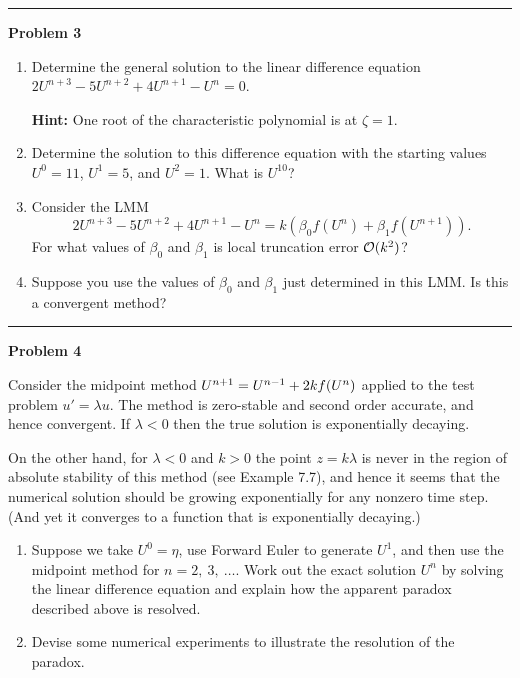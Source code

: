 \documentclass[10pt]{article}
\begin{document}


\vskip 1cm
\hrule
{\bf Problem 3}

\begin{enumerate}
\item Determine the general solution to the linear difference equation
$2U^{n+3} - 5U^{n+2} + 4U^{n+1} - U^n = 0$.

{\bf Hint:} One root of the characteristic polynomial is at $\zeta=1$.

\item Determine the solution to this difference equation with the starting
values $U^0=11$, $U^1=5$, and $U^2=1$.  What is $U^{10}$?

\item Consider the LMM
\[
2U^{n+3} - 5U^{n+2} + 4U^{n+1} - U^n = k(\beta_0 f(U^n) + \beta_1 f(U^{n+1})).
\]
For what values of $\beta_0$ and $\beta_1$ is local truncation error
${\mathcal O}(k^2)$?

\item Suppose you use the values of $\beta_0$ and $\beta_1$ just determined
in this LMM.  Is this a convergent method?

\end{enumerate} 




\vskip 1cm
\hrule
{\bf Problem 4}

Consider the midpoint method $U^{n+1} = U^{n-1} + 2kf(U^n)$ applied to the test
problem $u' = \lambda u$.  The method is zero-stable and second order
accurate, and hence convergent.  If $\lambda<0$ then the true solution
is exponentially decaying.

On the other hand, for $\lambda<0$ and $k>0$ the point $z=k\lambda$ is never
in the region of absolute stability of this method (see Example 7.7),
and hence it seems that the numerical solution should be growing
exponentially for any nonzero time step.  (And yet it converges to
a function that is exponentially decaying.)

\begin{enumerate} 
\item
Suppose we take $U^0=\eta$, use Forward Euler to generate $U^1$, and then
use the midpoint method for $n=2,~3,~\ldots$.  Work out the exact solution
$U^n$ by solving the linear difference equation and explain how the apparent
paradox described above is resolved.

\item Devise some numerical experiments to illustrate the resolution of the
paradox.
\end{enumerate} 
\end{document}
